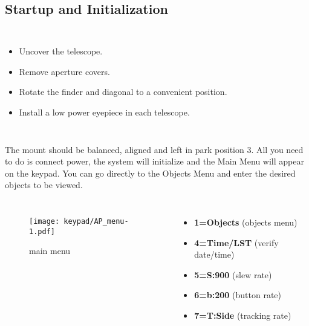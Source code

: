 \subsection{Startup and Initialization}

\begin{frame}[t]{\insertsubsectionhead}
  \begin{columns}[T]
    \centering
      \Large
      \begin{itemize}
        \item Uncover the telescope.
        \item Remove aperture covers.
        \item Rotate the finder and diagonal to a convenient position.
        \item Install a low power eyepiece in each telescope.
      \end{itemize}
  \end{columns}
  \end{frame}


\begin{frame}[t]{\insertsubsectionhead}
  \large
    The mount should be balanced, aligned and left in park position 3. All you
    need to do is connect power, the system will initialize and the Main Menu
    will appear on the keypad. You can go directly to the Objects Menu and
    enter the desired objects to be viewed.
  \begin{columns}[T]
      \begin{figure}[h]
          \texttt{[image: keypad/AP\_menu-1.pdf]}
        \caption{main menu}
      \end{figure}
      \begin{itemize}
          \item[] \textbf{1=Objects} (objects menu)
          \item[] \textbf{4=Time/LST} (verify date/time)
          \item[] \textbf{5=S:900}   (slew rate)
          \item[] \textbf{6=b:200}   (button rate)
          \item[] \textbf{7=T:Side}  (tracking rate)
      \end{itemize}
  \end{columns}
\end{frame}

